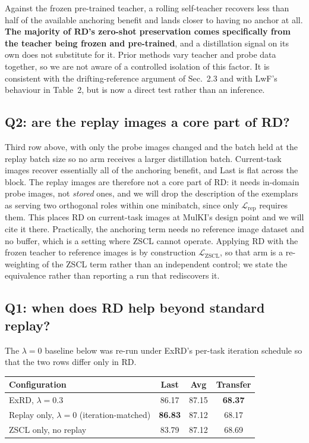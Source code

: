 \noindent Against the frozen pre-trained teacher, a rolling self-teacher
recovers less than half of the available anchoring benefit and lands closer to
having no anchor at all. \textbf{The majority of RD's zero-shot preservation
comes specifically from the teacher being frozen and pre-trained}, and a
distillation signal on its own does not substitute for it. Prior methods vary
teacher and probe data together, so we are not aware of a controlled isolation
of this factor. It is consistent with the drifting-reference argument of
Sec.~2.3 and with LwF's behaviour in Table~2, but is now a direct test rather
than an inference.

\subsection*{Q2: are the replay images a core part of RD?}

Third row above, with only the probe images changed and the batch held at the
replay batch size so no arm receives a larger distillation batch. Current-task
images recover essentially all of the anchoring benefit, and Last is flat across
the block. The replay images are therefore not a core part of RD: it needs
in-domain probe images, not \emph{stored} ones, and we will drop the description
of the exemplars as serving two orthogonal roles within one minibatch, since
only $\mathcal{L}_\text{rep}$ requires them. This places RD on current-task
images at MulKI's design point and we will cite it there. Practically, the
anchoring term needs no reference image dataset and no buffer, which is a
setting where ZSCL cannot operate. Applying RD with the frozen teacher to
reference images is by construction $\mathcal{L}_\text{ZSCL}$, so that arm is a
re-weighting of the ZSCL term rather than an independent control; we state the
equivalence rather than reporting a run that rediscovers it.

\subsection*{Q1: when does RD help beyond standard replay?}

The $\lambda{=}0$ baseline below was re-run under ExRD's per-task iteration
schedule so that the two rows differ only in RD.

\begin{table}[h]\centering\small
\begin{tabular}{lccc}
\hline
\textbf{Configuration} & \textbf{Last} & \textbf{Avg} & \textbf{Transfer} \\
\hline
ExRD, $\lambda{=}0.3$ & 86.17 & 87.15 & \textbf{68.37} \\
Replay only, $\lambda{=}0$ (iteration-matched) & \textbf{86.83} & 87.12 & 68.17 \\
ZSCL only, no replay & 83.79 & 87.12 & 68.69 \\
\hline
\end{tabular}
\end{table}

